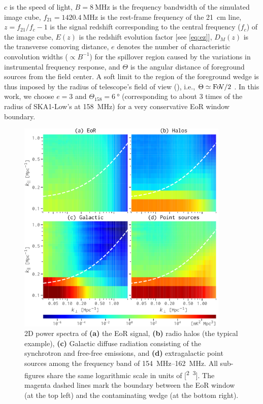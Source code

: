 \documentclass[modern]{aastex62}
\newcommand{\fov}{\text{Fo\!V}}
\begin{document}
$c$ is the speed of light,
$B = \SI{8}{\MHz}$ is the frequency bandwidth of the simulated image cube,
$f_{21} = \SI{1420.4}{\MHz}$ is the rest-frame frequency of the 21~cm line,
$z = f_{21}/f_c - 1$ is the signal redshift corresponding to the central
frequency ($f_c$) of the image cube,
$E(z)$ is the redshift evolution factor [see \autoref{eq:ez}],
$D_{\!M}(z)$ is the transverse comoving distance,
$e$ denotes the number of characteristic convolution widths
($\propto B^{-1}$) for the spillover region caused by the variations in
instrumental frequency response,
and $\Theta$ is the angular distance of foreground sources from the
field center.
A soft limit to the region of the foreground wedge is thus imposed by the
radius of telescope's field of view (\fov), i.e., $\Theta \simeq \fov/2$
\citep{morales2012}.
In this work, we choose $e = 3$ and $\Theta_{158} = \SI{6}{\degree}$
(corresponding to about 3 times of the radius of SKA1-Low's \fov{} at
\SI{158}{\MHz}) for a very conservative EoR window boundary.

\begin{figure}
  \centering
  \includegraphics[width=0.9\textwidth]{ps2d-band158}
  \caption{\label{fig:ps2d}%
    2D power spectra of
    \textbf{(a)} the EoR signal,
    \textbf{(b)} radio halos (the typical example),
    \textbf{(c)} Galactic diffuse radiation consisting of the synchrotron
    and free-free emissions,
    and
    \textbf{(d)} extragalactic point sources
    among the frequency band of \SIrange{154}{162}{\MHz}.
    All sub-figures share the same logarithmic scale in units of
    [\si{\mK\squared\Mpc\cubed}].
    The magenta dashed lines mark the boundary between the EoR window
    (at the top left) and the contaminating wedge (at the bottom right).
  }
\end{figure}
\end{document}
